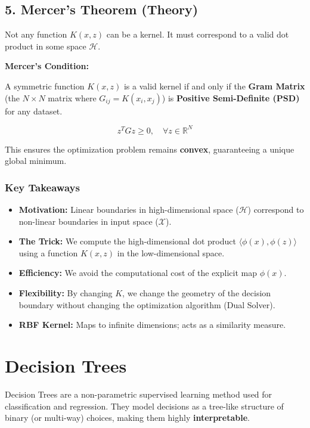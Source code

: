\documentclass[
  italian,
  11pt,
]{article}
\begin{document}
\subsection{5. Mercer's Theorem (Theory)}\label{mercers-theorem-theory}

Not any function \(K(x, z)\) can be a kernel. It must correspond to a
valid dot product in some space \(\mathcal{H}\).

\textbf{Mercer's Condition:}

A symmetric function \(K(x, z)\) is a valid kernel if and only if the
\textbf{Gram Matrix} (the \(N \times N\) matrix where
\(G_{ij} = K(x_i, x_j)\)) is \textbf{Positive Semi-Definite (PSD)} for
any dataset.

\[z^T G z \geq 0, \quad \forall z \in \mathbb{R}^N\]

This ensures the optimization problem remains \textbf{convex},
guaranteeing a unique global minimum.

\subsubsection{Key Takeaways}\label{key-takeaways-16}

\begin{itemize}
\item
  \textbf{Motivation:} Linear boundaries in high-dimensional space
  (\(\mathcal{H}\)) correspond to non-linear boundaries in input space
  (\(\mathcal{X}\)).
\item
  \textbf{The Trick:} We compute the high-dimensional dot product
  \(\langle \phi(x), \phi(z) \rangle\) using a function \(K(x, z)\) in
  the low-dimensional space.
\item
  \textbf{Efficiency:} We avoid the computational cost of the explicit
  map \(\phi(x)\).
\item
  \textbf{Flexibility:} By changing \(K\), we change the geometry of the
  decision boundary without changing the optimization algorithm (Dual
  Solver).
\item
  \textbf{RBF Kernel:} Maps to infinite dimensions; acts as a similarity
  measure.

  \newpage
\end{itemize}

\section{Decision Trees}\label{decision-trees}

Decision Trees are a non-parametric supervised learning method used for
classification and regression. They model decisions as a tree-like
structure of binary (or multi-way) choices, making them highly
\textbf{interpretable}.
\end{document}
